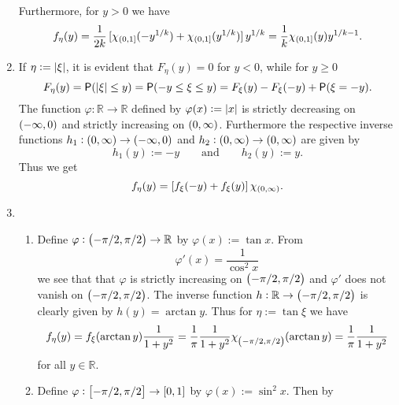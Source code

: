 \begin{enumerate}[label = \textbf{Exercise \arabic*.},wide = 0pt, itemsep=1.5ex]
		Furthermore, for $y > 0$ we have
		\begin{equation}
			f_\eta(y) = \frac{1}{2k}\sbr[0]{\chi_{\intoc{0,1}}(-y^{1/k}) + \chi_{\intoc{0,1}}(y^{1/k})}y^{1/k} = \frac{1}{k}\chi_{\intoc{0,1}}(y)y^{1/k - 1}.
		\end{equation}
	\item If $\eta := \abs[0]{\xi}$, it is evident that $F_\eta(y) = 0$ for $y < 0$, while for $y \geq 0$
		\begin{equation}
			F_\eta(y) = \Psf(\abs[0]{\xi} \leq y) = \Psf(-y \leq \xi \leq y) = F_\xi(y) - F_\xi(-y) + \Psf(\xi = - y).
		\end{equation} 
		The function $\varphi: \mathbb{R} \to \mathbb{R}$ defined by $\varphi(x) := \abs[0]{x}$ is strictly decreasing on $\intoo{-\infty,0}$ and strictly increasing on $\intoo{0,\infty}$. Furthermore the respective inverse functions $h_1: \intoo{0,\infty} \to \intoo{-\infty,0}$ and $h_2: \intoo{0,\infty} \to \intoo{0,\infty}$ are given by 
		\begin{equation}
			h_1(y) := -y \qquad \text{and} \qquad h_2(y) := y.
		\end{equation}
		Thus we get
		\begin{equation}
			f_\eta(y) = \sbr[0]{f_\xi(-y) + f_\xi(y)}\chi_{\intoo{0,\infty}}.
		\end{equation}
	\item
		~
		\begin{enumerate}[label = \arabic*.,wide = 0pt, itemsep=1.5ex]
			\item Define $\varphi: \intoo{-\pi/2,\pi/2} \to \mathbb{R}$ by $\varphi(x) := \tan x$. From
				\begin{equation}
					\varphi'(x) = \frac{1}{\cos^2x}
				\end{equation}
				\noindent we see that that $\varphi$ is strictly increasing on $\intoo{-\pi/2,\pi/2}$ and $\varphi'$ does not vanish on $\intoo{-\pi/2,\pi/2}$. The inverse function $h: \mathbb{R} \to \intoo{-\pi/2,\pi/2}$ is clearly given by $h(y) = \arctan y$. Thus for $\eta := \tan \xi$ we have
				\begin{equation}
					f_\eta(y) = f_\xi(\arctan y)\frac{1}{1 + y^2} = \frac{1}{\pi} \frac{1}{1 + y^2}\chi_{\intoo{-\pi/2,\pi/2}}(\arctan y) = \frac{1}{\pi} \frac{1}{1 + y^2}
				\end{equation}
				\noindent for all $y \in \mathbb{R}$.
			\item Define $\varphi: \intcc{-\pi/2,\pi/2} \to \intcc{0,1}$ by $\varphi(x) := \sin^2 x$. Then by
				\begin{equation}

\end{equation}
\end{enumerate}
\end{enumerate}
